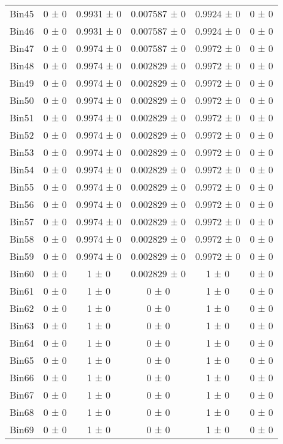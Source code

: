 \begin{tabular}{@{\extracolsep{4pt}}lccccc@{}}
     Bin45 & 0 ± 0 & 0.9931 ± 0 & 0.007587 ± 0 & 0.9924 ± 0 & 0 ± 0 \\ 
     Bin46 & 0 ± 0 & 0.9931 ± 0 & 0.007587 ± 0 & 0.9924 ± 0 & 0 ± 0 \\ 
     Bin47 & 0 ± 0 & 0.9974 ± 0 & 0.007587 ± 0 & 0.9972 ± 0 & 0 ± 0 \\ 
     Bin48 & 0 ± 0 & 0.9974 ± 0 & 0.002829 ± 0 & 0.9972 ± 0 & 0 ± 0 \\ 
     Bin49 & 0 ± 0 & 0.9974 ± 0 & 0.002829 ± 0 & 0.9972 ± 0 & 0 ± 0 \\ 
     Bin50 & 0 ± 0 & 0.9974 ± 0 & 0.002829 ± 0 & 0.9972 ± 0 & 0 ± 0 \\ 
     Bin51 & 0 ± 0 & 0.9974 ± 0 & 0.002829 ± 0 & 0.9972 ± 0 & 0 ± 0 \\ 
     Bin52 & 0 ± 0 & 0.9974 ± 0 & 0.002829 ± 0 & 0.9972 ± 0 & 0 ± 0 \\ 
     Bin53 & 0 ± 0 & 0.9974 ± 0 & 0.002829 ± 0 & 0.9972 ± 0 & 0 ± 0 \\ 
     Bin54 & 0 ± 0 & 0.9974 ± 0 & 0.002829 ± 0 & 0.9972 ± 0 & 0 ± 0 \\ 
     Bin55 & 0 ± 0 & 0.9974 ± 0 & 0.002829 ± 0 & 0.9972 ± 0 & 0 ± 0 \\ 
     Bin56 & 0 ± 0 & 0.9974 ± 0 & 0.002829 ± 0 & 0.9972 ± 0 & 0 ± 0 \\ 
     Bin57 & 0 ± 0 & 0.9974 ± 0 & 0.002829 ± 0 & 0.9972 ± 0 & 0 ± 0 \\ 
     Bin58 & 0 ± 0 & 0.9974 ± 0 & 0.002829 ± 0 & 0.9972 ± 0 & 0 ± 0 \\ 
     Bin59 & 0 ± 0 & 0.9974 ± 0 & 0.002829 ± 0 & 0.9972 ± 0 & 0 ± 0 \\ 
     Bin60 & 0 ± 0 & 1 ± 0 & 0.002829 ± 0 & 1 ± 0 & 0 ± 0 \\ 
     Bin61 & 0 ± 0 & 1 ± 0 & 0 ± 0 & 1 ± 0 & 0 ± 0 \\ 
     Bin62 & 0 ± 0 & 1 ± 0 & 0 ± 0 & 1 ± 0 & 0 ± 0 \\ 
     Bin63 & 0 ± 0 & 1 ± 0 & 0 ± 0 & 1 ± 0 & 0 ± 0 \\ 
     Bin64 & 0 ± 0 & 1 ± 0 & 0 ± 0 & 1 ± 0 & 0 ± 0 \\ 
     Bin65 & 0 ± 0 & 1 ± 0 & 0 ± 0 & 1 ± 0 & 0 ± 0 \\ 
     Bin66 & 0 ± 0 & 1 ± 0 & 0 ± 0 & 1 ± 0 & 0 ± 0 \\ 
     Bin67 & 0 ± 0 & 1 ± 0 & 0 ± 0 & 1 ± 0 & 0 ± 0 \\ 
     Bin68 & 0 ± 0 & 1 ± 0 & 0 ± 0 & 1 ± 0 & 0 ± 0 \\ 
     Bin69 & 0 ± 0 & 1 ± 0 & 0 ± 0 & 1 ± 0 & 0 ± 0 \\ 

\end{tabular}
